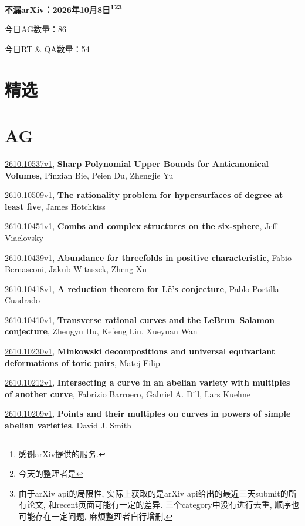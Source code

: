 \documentclass[9pt, a4paper]{article}
\theoremstyle{plain}
\theoremstyle{definition}
\theoremstyle{remark}
\newcommand{\arxiv}[3]{\href{https://arxiv.org/abs/#1}{#1}, \textbf{\textcolor{arxivblue}{#2}}, #3}
\newcommand{\AGnumber}{86}
\newcommand{\RTQAnumber}{54}
\newcommand{\NewestDate}{2026年10月8日}
\newcommand{\todayarXiver}{} %
\begin{document}
\begin{center}
    \Huge\textbf{不漏arXiv：\NewestDate\footnote{感谢arXiv提供的服务.}\footnote{今天的整理者是\todayarXiver}\footnote{由于arXiv api的局限性, 实际上获取的是arXiv api给出的最近三天submit的所有论文, 和recent页面可能有一定的差异. 三个category中没有进行去重, 顺序也可能存在一定问题, 麻烦整理者自行增删.}} \\
\end{center}

\setcounter{section}{-1}

\begin{center}
    今日AG数量：\AGnumber
    
    今日RT \& QA数量：\RTQAnumber
    
\end{center}


\section{精选}


\section{AG}
\arxiv{2610.10537v1}{Sharp Polynomial Upper Bounds for Anticanonical Volumes}{Pinxian Bie, Peien Du, Zhengjie Yu}

\arxiv{2610.10509v1}{The rationality problem for hypersurfaces of degree at least five}{James Hotchkiss}

\arxiv{2610.10451v1}{Combs and complex structures on the six-sphere}{Jeff Viaclovsky}

\arxiv{2610.10439v1}{Abundance for threefolds in positive characteristic}{Fabio Bernasconi, Jakub Witaszek, Zheng Xu}

\arxiv{2610.10418v1}{A reduction theorem for Lê's conjecture}{Pablo Portilla Cuadrado}

\arxiv{2610.10410v1}{Transverse rational curves and the LeBrun--Salamon conjecture}{Zhengyu Hu, Kefeng Liu, Xueyuan Wan}

\arxiv{2610.10230v1}{Minkowski decompositions and universal equivariant deformations of toric pairs}{Matej Filip}

\arxiv{2610.10212v1}{Intersecting a curve in an abelian variety with multiples of another curve}{Fabrizio Barroero, Gabriel A. Dill, Lars Kuehne}

\arxiv{2610.10209v1}{Points and their multiples on curves in powers of simple abelian varieties}{David J. Smith}
\end{document}

